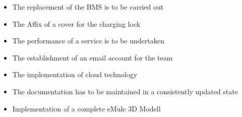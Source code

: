 \begin{itemize}
	\item The replacement of the BMS is to be carried out
\item The Affix of a cover for the charging lock
\item The performance of a service is to be undertaken
\item The establishment of an email account for the team
\item The implementation of cloud technology
\item The documentation has to be maintained in a consistently updated state
\item Implementation af a complete eMule 3D Modell
	
\end{itemize}
